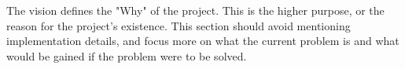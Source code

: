The vision defines the "Why" of the project. This is the higher purpose, or the reason for the project’s existence. This section should avoid mentioning implementation details, and focus more on what the current problem is and what would be gained if the problem were to be solved. 
